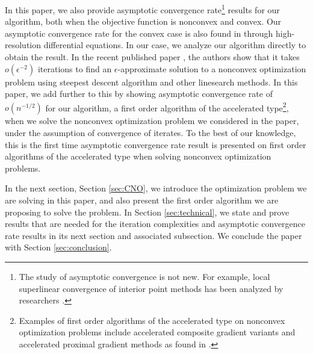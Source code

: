 \documentclass[11pt]{article}
\begin{document}
\noindent In this paper, we also provide asymptotic convergence rate\footnote{The study of asymptotic convergence is not new.  For example, local superlinear convergence of interior point methods has been analyzed by researchers \cite{Kojima, Luo, Nesterov2, Potra1, Sim1, Wright}.} results for our algorithm, both when the objective function is nonconvex and convex.  Our asymptotic convergence rate for the convex case is also found in \cite{Chen} through high-resolution differential equations.  In our case, we analyze our algorithm directly to obtain the result.   In the recent published paper \cite{Gratton}, the authors show that it takes $o(\epsilon^{-2})$ iterations to find an $\epsilon$-approximate solution to a nonconvex optimization problem using steepest descent algorithm and other linesearch methods.  In this paper, we add further to this by showing asymptotic convergence rate of $o(n^{-1/2})$ for our algorithm, a first order algorithm of the accelerated type\footnote{Examples of first order algorithms of the accelerated type on nonconvex optimization problems include accelerated composite gradient variants \cite{Liang3} and accelerated proximal gradient methods as found in \cite{Li}.}, when we solve the nonconvex optimization problem we considered in the paper, under the assumption of convergence of iterates.   To the best of our knowledge, this is the first time asymptotic convergence rate result is presented on first order algorithms of the accelerated type when solving nonconvex optimization problems.


\vspace{10pt}

\noindent In the next section, Section \ref{sec:CNO}, we introduce the optimization problem we are solving in this paper, and also present the first order algorithm we are proposing to solve the problem.   In Section \ref{sec:technical}, we state and prove results that are needed for the iteration complexities and asymptotic convergence rate results in its next section and associated subsection.  We conclude the paper with Section \ref{sec:conclusion}.
\end{document}
